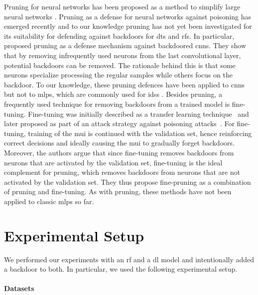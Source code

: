 \documentclass[10pt,sigconf,letterpaper,dvipsnames]{acmart}
\newcommand\note[2]{{\color{#1}#2}}
\newcommand\todo[1]{{\note{red}{TODO: #1}}}
\begin{document}
Pruning for neural networks has been proposed
as a method to simplify large neural networks \cite{sietsma_neural_1988}.
Pruning as a defense for neural networks against poisoning has emerged recently \cite{gu_badnets:_2017} and to our knowledge pruning has not yet been investigated for its suitability for defending against backdoors for \glspl{dt} and \glspl{rf}.
In particular, \cite{gu_badnets:_2017} proposed pruning as a defense mechanism against backdoored \glspl{cnn}. They show that by removing infrequently used neurons from the last convolutional layer, potential backdoors can be removed. The rationale behind this is that some neurons specialize processing the regular samples while others focus on the backdoor. To our knowledge, these pruning defences have been applied to \glspl{cnn} but not to \glspl{mlp}, which are commonly used for \glspl{ids} \cite{meghdouri_analysis_2018}. 
Besides pruning, a frequently used technique for removing backdoors from a trained model is fine-tuning. Fine-tuning was initially described as a transfer learning technique~\cite{yosinski_how_2014} and later proposed as part of an attack strategy against poisoning attacks~\cite{liu_fine-pruning:_2018}. For fine-tuning, training of the \gls{mui} is continued with the validation set, hence reinforcing correct decisions and ideally causing the \gls{mui} to gradually forget backdoors. Moreover, the authors argue that since fine-tuning removes backdoors from neurons that are activated by the validation set, fine-tuning is the ideal complement for pruning, which removes backdoors from neurons that are not activated by the validation set. They thus propose fine-pruning as a combination of pruning and fine-tuning. As with pruning, these methods have not been applied to classic \glspl{mlp} so far.

\section{Experimental Setup} \label{sec:ml_approaches}
We performed our experiments with an \gls{rf} and a \gls{dl} model and intentionally added a backdoor to both. In particular, we used the following experimental setup.
\paragraph{Datasets}
\end{document}
